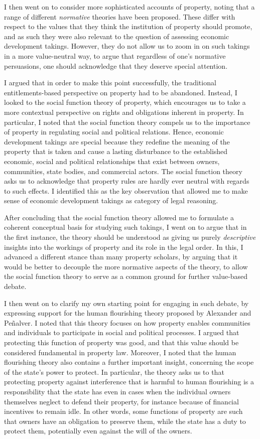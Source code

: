 I then went on to consider more sophisticated accounts of property, noting that a range of different {\it normative} theories have been proposed. These differ with respect to the values that they think the institution of property should promote, and as such they were also relevant to the question of assessing economic development takings. However, they do not allow us to zoom in on such takings in a more value-neutral way, to argue that regardless of one's normative persuasions, one should acknowledge that they deserve special attention.

I argued that in order to make this point successfully, the traditional entitlements-based perspective on property had to be abandoned. Instead, I looked to the social function theory of property, which encourages us to take a more contextual perspective on rights and obligations inherent in property. In particular, I noted that the social function theory compels us to  the importance of property in regulating social and political relations. Hence, economic development takings are special because they redefine the meaning of the property that is taken and cause a lasting disturbance to the established economic, social and political relationships that exist between owners, communities, state bodies, and commercial actors. The social function theory asks us to acknowledge that property rules are hardly ever neutral with regards to such effects. I identified this as the key observation that allowed me to make sense of economic development takings as category of legal reasoning.

After concluding that the social function theory allowed me to formulate a coherent conceptual basis for studying such takings, I went on to argue that in the first instance, the theory should be understood as giving us purely {\it descriptive} insights into the workings of property and its role in the legal order. In this, I advanced a different stance than many property scholars, by arguing that it would be better to decouple the more normative aspects of the theory, to allow the social function theory to serve as a common ground for further value-based debate.

I then went on to clarify my own starting point for engaging in such debate, by expressing support for the human flourishing theory proposed by Alexander and Pe\~{n}alver. I noted that this theory focuses on how property enables communities and individuals to  participate in social and political processes. I argued that protecting this function of property was good, and that this value should be considered fundamental in property law. Moreover, I noted that the human flourishing theory also contains a further important insight, concerning the scope of the state's power to protect. In particular, the theory asks us to  that protecting property against interference that is harmful to human flourishing is a responsibility that the state has even in cases when the individual owners themselves neglect to defend their property, for instance because of financial incentives to remain idle. In other words, some functions of property are such that owners have an obligation to preserve them, while the state has a duty to protect them, potentially even against the will of the owners.

